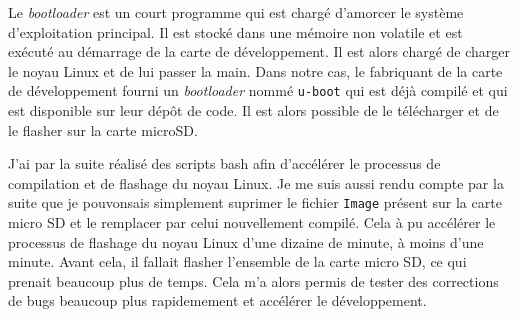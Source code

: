 Le \textit{bootloader} est un court programme qui est chargé d'amorcer le système d'exploitation principal. Il est stocké dans une mémoire non volatile et est exécuté au démarrage de la carte de développement. Il est alors chargé de charger le noyau Linux et de lui passer la main. Dans notre cas, le fabriquant de la carte de développement fourni un \textit{bootloader} nommé \texttt{u-boot} qui est déjà compilé et qui est disponible sur leur dépôt de code. Il est alors possible de le télécharger et de le flasher sur la carte microSD.

J'ai par la suite réalisé des scripts bash afin d'accélérer le processus de compilation et de flashage du noyau Linux. Je me suis aussi rendu compte par la suite que je pouvonsais simplement suprimer le fichier \texttt{Image} présent sur la carte micro SD et le remplacer par celui nouvellement compilé. Cela à pu accélérer le processus de flashage du noyau Linux d'une dizaine de minute, à moins d'une minute. Avant cela, il fallait flasher l'ensemble de la carte micro SD, ce qui prenait beaucoup plus de temps. Cela m'a alors permis de tester des corrections de bugs beaucoup plus rapidemement et accélérer le développement.